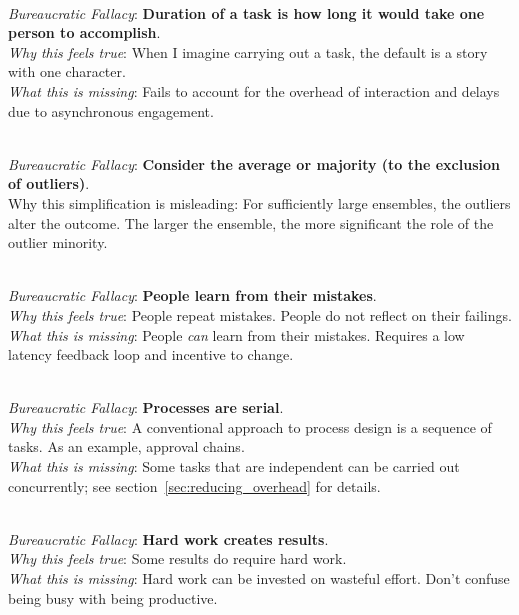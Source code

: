 \ \\

\textit{Bureaucratic Fallacy}: \textbf{Duration of a task is how long it would take one person to accomplish}.  \\
\textit{Why this feels true}: When I imagine carrying out a task, the default is a story with one character. \\
\textit{What this is missing}: Fails to account for the overhead of interaction and delays due to asynchronous engagement.


\ \\

\textit{Bureaucratic Fallacy}: \textbf{Consider the average or majority (to the exclusion of outliers)}. \\
Why this simplification is misleading: For sufficiently large ensembles, the outliers alter the outcome. The larger the ensemble, the more significant the role of the outlier minority.

\ \\

\textit{Bureaucratic Fallacy}: \textbf{People learn from their mistakes}. \\
\textit{Why this feels true}: People repeat mistakes. People do not reflect on their failings. \\
\textit{What this is missing}: People \textit{can} learn from their mistakes. Requires a low latency feedback loop and incentive to change.

\ \\

\textit{Bureaucratic Fallacy}: \textbf{Processes are serial}.\\
\textit{Why this feels true}: A conventional approach to process design is a sequence of tasks. As an example, approval chains. \\
\textit{What this is missing}: Some tasks that are independent can be carried out concurrently; see section~\ref{sec:reducing_overhead} for details.


\ \\

\textit{Bureaucratic Fallacy}: \textbf{Hard work creates results}.\\
\textit{Why this feels true}: Some results do require hard work. \\
\textit{What this is missing}: Hard work can be invested on wasteful effort. Don't confuse being busy with being productive.

